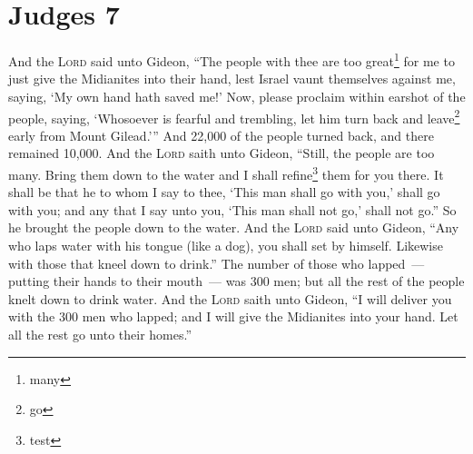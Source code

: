 \section{Judges 7}\label{Judges 7}
\begin{enumerate}
     And the \textsc{Lord} said unto Gideon, ``The people with thee are too great\footnote{many} for me to just give the Midianites into their hand, lest Israel vaunt themselves against me, saying, `My own hand hath saved me!'%
     Now, please proclaim within earshot of the people, saying, `Whosoever is fearful and trembling, let him turn back and leave\footnote{go} early from Mount Gilead.''' And 22,000 of the people turned back, and there remained 10,000.%
     And the \textsc{Lord} saith unto Gideon, ``Still, the people are too many. Bring them down to the water and I shall refine\footnote{test} them for you there. It shall be that he to whom I say to thee, `This man shall go with you,' shall go with you; and any that I say unto you, `This man shall not go,' shall not go.''%
     So he brought the people down to the water. And the \textsc{Lord} said unto Gideon, ``Any who laps water with his tongue (like a dog), you shall set by himself. Likewise with those that kneel down to drink.''%
     The number of those who lapped~--- putting their hands to their mouth~--- was 300 men; but all the rest of the people knelt down to drink water.%
     And the \textsc{Lord} saith unto Gideon, ``I will deliver you with the 300 men who lapped; and I will give the Midianites into your hand. Let all the rest go unto their homes.''%
\end{enumerate}
